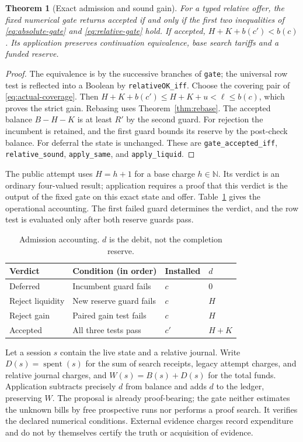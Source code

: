 \documentclass[10pt,letterpaper]{article}
\newtheorem{theorem}{Theorem}[section]
\newcommand{\Nat}{\mathbb N}
\newcommand{\spent}{\operatorname{spent}}
\newcommand{\rc}[1]{\texttt{#1}}
\begin{document}
\begin{theorem}[Exact admission and sound gain]\label{thm:gate}
For a typed relative offer, the fixed numerical gate returns \emph{accepted} if and only if the first two inequalities of \eqref{eq:absolute-gate} and \eqref{eq:relative-gate} hold. If accepted, $H+K+b(c')<b(c)$. Its application preserves continuation equivalence, base search tariffs and a funded reserve.
\end{theorem}
\begin{proof}
The equivalence is by the successive branches of \rc{gate}; the universal row test is reflected into a Boolean by \rc{relativeOK\_iff}. Choose the covering pair of \eqref{eq:actual-coverage}. Then $H+K+b(c')\le H+K+u<\ell\le b(c)$, which proves the strict gain. Rebasing uses Theorem~\ref{thm:rebase}. The accepted balance $B-H-K$ is at least $R'$ by the second guard. For rejection the incumbent is retained, and the first guard bounds its reserve by the post-check balance. For deferral the state is unchanged. These are \rc{gate\_accepted\_iff}, \rc{relative\_sound}, \rc{apply\_same}, and \rc{apply\_liquid}.
\end{proof}

The public attempt uses $H=h+1$ for a base charge $h\in\Nat$. Its verdict is an ordinary four-valued result; application requires a proof that this verdict is the output of the fixed gate on this exact state and offer. Table~\ref{tab:debit} gives the operational accounting. The first failed guard determines the verdict, and the row test is evaluated only after both reserve guards pass.
\begin{table}[htbp]
\centering\small
\caption{Admission accounting. $d$ is the debit, not the completion reserve.}\label{tab:debit}
\begin{tabularx}{\linewidth}{@{}lXll@{}}\toprule
Verdict & Condition (in order) & Installed & $d$\\\midrule
Deferred & Incumbent guard fails & $c$ & $0$\\
Reject liquidity & New reserve guard fails & $c$ & $H$\\
Reject gain & Paired gain test fails & $c$ & $H$\\
Accepted & All three tests pass & $c'$ & $H+K$\\\bottomrule
\end{tabularx}
\end{table}

Let a session $s$ contain the live state and a relative journal. Write $D(s)=\spent(s)$ for the sum of search receipts, legacy attempt charges, and relative journal charges, and $W(s)=B(s)+D(s)$ for the total funds. Application subtracts precisely $d$ from balance and adds $d$ to the ledger, preserving $W$. The proposal is already proof-bearing; the gate neither estimates the unknown bills by free prospective runs nor performs a proof search. It verifies the declared numerical conditions. External evidence charges record expenditure and do not by themselves certify the truth or acquisition of evidence.
\end{document}
